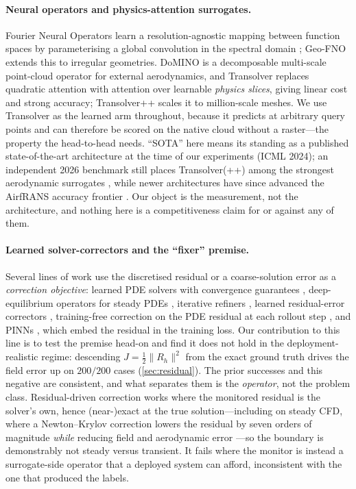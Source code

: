 \paragraph{Neural operators and physics-attention surrogates.} Fourier Neural Operators
learn a resolution-agnostic mapping between function spaces by parameterising a global
convolution in the spectral domain \citep{li2021fno}; Geo-FNO \citep{li2022geofno} extends
this to irregular geometries. DoMINO \citep{ranade2025domino} is a decomposable
multi-scale point-cloud operator for external aerodynamics, and Transolver
\citep{wu2024transolver} replaces quadratic attention with attention over learnable
\emph{physics slices}, giving linear cost and strong accuracy; Transolver++
\citep{luo2025transolverpp} scales it to million-scale meshes. We use Transolver as the
learned arm throughout, because it predicts at arbitrary query points and can therefore be
scored on the native cloud without a raster---the property the head-to-head needs.
``SOTA'' here means its standing as a published state-of-the-art architecture at the time
of our experiments (ICML 2024); an independent 2026 benchmark still places
Transolver(++) among the strongest aerodynamic surrogates \citep{scherz2026evaluation},
while newer architectures have since advanced the AirfRANS accuracy frontier
\citep{rigotti2026gist}. Our object is the measurement, not the architecture, and nothing
here is a competitiveness claim for or against any of them.

\paragraph{Learned solver-correctors and the ``fixer'' premise.} Several lines of work
use the discretised residual or a coarse-solution error as a \emph{correction objective}:
learned PDE solvers with convergence guarantees \citep{hsieh2019neuralpde},
deep-equilibrium operators for steady PDEs \citep{marwah2023fnodeq}, iterative refiners
\citep{lippe2023pderefiner}, learned residual-error correctors
\citep{learned2023residualcorrection}, training-free correction on the PDE residual at
each rollout step \citep{huang2025physicscorrect}, and PINNs \citep{raissi2019pinn}, which
embed the residual in the training loss. Our contribution to this line is to test the
premise head-on and find it does not hold in the deployment-realistic regime: descending
$J=\tfrac12\|R_h\|^2$ from the exact ground truth drives the field error up on $200/200$
cases (\autoref{sec:residual}). The prior successes and this negative are consistent, and
what separates them is the \emph{operator}, not the problem class. Residual-driven
correction works where the monitored residual is the solver's own, hence (near-)exact at
the true solution---including on steady CFD, where a Newton--Krylov correction lowers the
residual by seven orders of magnitude \emph{while} reducing field and aerodynamic error
\citep{lei2026newtonkrylov}---so the boundary is demonstrably not steady versus transient.
It fails where the monitor is instead a surrogate-side operator that a deployed system can
afford, inconsistent with the one that produced the labels.

